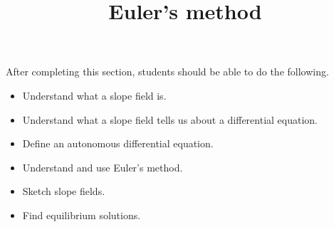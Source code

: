 \documentclass{ximera}
\title{Euler's method}
\begin{document}
\begin{abstract}
\end{abstract}

\maketitle

\begin{sectionOutcomes}

After completing this section, students should be able to do the following.

\begin{itemize}
\item Understand what a slope field is.
\item Understand what a slope field tells us about a differential equation.
\item Define an autonomous differential equation.
\item Understand and use Euler's method.
\item Sketch slope fields.
\item Find equilibrium solutions.
\end{itemize}

\end{sectionOutcomes}
\end{document}
